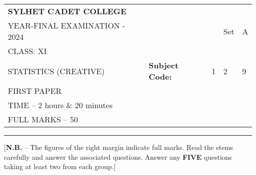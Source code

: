 \documentclass{article}
\begin{document}
\begin{table}[h]
\centering
\begin{tabular}{lllll}
\textbf{\large SYLHET CADET COLLEGE} &  &  &  &  \\ \cline{4-5} 
YEAR-FINAL EXAMINATION - 2024 &  & \multicolumn{1}{l|}{} & \multicolumn{1}{l|}{Set} & \multicolumn{1}{l|}{A} \\ \cline{4-5} 
CLASS: XI &  &  &  &  \\ \cline{3-5} 
STATISTICS (CREATIVE)& \multicolumn{1}{l|}{\textbf{Subject Code:}} & \multicolumn{1}{l|}{1} & \multicolumn{1}{l|}{2} & \multicolumn{1}{l|}{9} \\ \cline{3-5} 
 FIRST PAPER &  &  &  &  \\
TIME – 2 hours \& 20 minutes &  &  &  &  \\
FULL MARKS – 50 &  &  &  & 
\end{tabular}
\end{table}

\hrule

\begin{center}
[\textbf{N.B.} – The figures of the right margin indicate full marks. Read the stems carefully and answer the associated questions. Answer any \textbf{FIVE} questions taking at least two from each group.]\\

\end{center}
\end{document}

